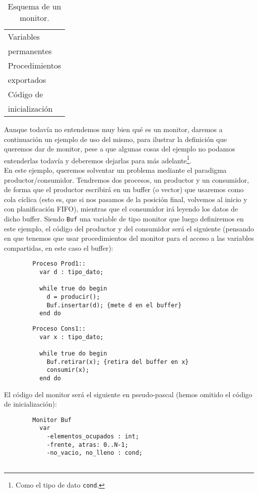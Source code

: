 \begin{table}[H]
\centering
\begin{tabular}{|l|}
\hline
Variables \\
permanentes \\
\hline
Procedimientos \\
exportados \\
\hline
Código de \\ 
inicialización \\
\hline
\end{tabular}
\caption{Esquema de un monitor.}
\label{esq:monitor_1}
\end{table}

\begin{ejemplo}
    Aunque todavía no entendemos muy bien qué es un monitor, daremos a continuación un ejemplo de uso del mismo, para ilustrar la definición que queremos dar de monitor, pese a que algunas cosas del ejemplo no podamos entenderlas todavía y deberemos dejarlas para más adelante\footnote{Como el tipo de dato \texttt{cond}.}.\\

    En este ejemplo, queremos solventar un problema mediante el paradigma productor/consumidor. Tendremos dos procesos, un productor y un consumidor, de forma que el productor escribirá en un buffer (o vector) que usaremos como cola cíclica (esto es, que si nos pasamos de la posición final, volvemos al inicio y con planificación FIFO), mientras que el consumidor irá leyendo los datos de dicho buffer. Siendo \verb|Buf| una variable de tipo monitor que luego definiremos en este ejemplo, el código del productor y del consumidor será el siguiente (pensando en que tenemos que usar procedimientos del monitor para el acceso a las variables compartidas, en este caso el buffer):
    \begin{verbatim}
        Proceso Prod1::
          var d : tipo_dato;

          while true do begin
            d = producir();
            Buf.insertar(d); {mete d en el buffer}
          end do
    \end{verbatim}
    \begin{verbatim}
        Proceso Cons1::
          var x : tipo_dato;

          while true do begin
            Buf.retirar(x); {retira del buffer en x}
            consumir(x);
          end do
    \end{verbatim}
    El código del monitor será el siguiente en pseudo-pascal (hemos omitido el código de inicialización):
    \begin{verbatim}
        Monitor Buf
          var
            -elementos_ocupados : int;
            -frente, atras: 0..N-1;
            -no_vacio, no_lleno : cond;


\end{verbatim}
\end{ejemplo}
